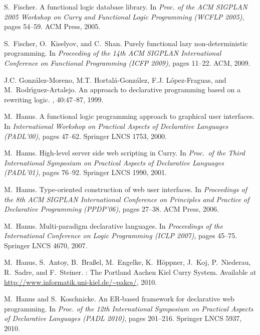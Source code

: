 \documentclass{llncs}
\begin{document}
\begin{thebibliography}{10}
S.~Fischer.
\newblock A functional logic database library.
\newblock In {\em Proc. of the ACM SIGPLAN 2005 Workshop on Curry and
  Functional Logic Programming (WCFLP 2005)}, pages 54--59. ACM Press, 2005.

S.~Fischer, O.~Kiselyov, and C.~Shan.
\newblock Purely functional lazy non-deterministic programming.
\newblock In {\em Proceeding of the 14th ACM SIGPLAN International Conference
  on Functional Programming (ICFP 2009)}, pages 11--22. ACM, 2009.

J.C. Gonz{\'a}lez-Moreno, M.T. Hortal{\'a}-Gonz{\'a}lez, F.J.
  L{\'o}pez-Fraguas, and M.~Rodr{\'\i}guez-Artalejo.
\newblock An approach to declarative programming based on a rewriting logic.
, 40:47--87, 1999.

M.~Hanus.
\newblock A functional logic programming approach to graphical user interfaces.
\newblock In {\em International Workshop on Practical Aspects of Declarative
  Languages (PADL'00)}, pages 47--62. Springer LNCS 1753, 2000.

M.~Hanus.
\newblock High-level server side web scripting in {Curry}.
\newblock In {\em Proc.\ of the Third International Symposium on Practical
  Aspects of Declarative Languages (PADL'01)}, pages 76--92. Springer LNCS
  1990, 2001.

M.~Hanus.
\newblock Type-oriented construction of web user interfaces.
\newblock In {\em Proceedings of the 8th ACM SIGPLAN International Conference
  on Principles and Practice of Declarative Programming (PPDP'06)}, pages
  27--38. ACM Press, 2006.

M.~Hanus.
\newblock Multi-paradigm declarative languages.
\newblock In {\em Proceedings of the International Conference on Logic
  Programming (ICLP 2007)}, pages 45--75. Springer LNCS 4670, 2007.

M.~Hanus, S.~Antoy, B.~Bra{\ss}el, M.~Engelke, K.~H{\"o}ppner, J.~Koj,
  P.~Niederau, R.~Sadre, and F.~Steiner.
: The {P}ortland {A}achen {K}iel {C}urry {S}ystem.
\newblock Available at \url{http://www.informatik.uni-kiel.de/~pakcs/}, 2010.

M.~Hanus and S.~Koschnicke.
\newblock An {ER-based} framework for declarative web programming.
\newblock In {\em Proc. of the 12th International Symposium on Practical
  Aspects of Declarative Languages (PADL 2010)}, pages 201--216. Springer LNCS
  5937, 2010.


\end{thebibliography}
\end{document}
